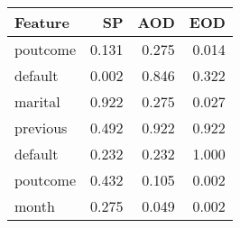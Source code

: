 \begin{tabular}{lrrr}
\toprule
Feature & SP & AOD & EOD \\
\midrule
poutcome & 0.131 & 0.275 & 0.014 \\
default & 0.002 & 0.846 & 0.322 \\
marital & 0.922 & 0.275 & 0.027 \\
previous & 0.492 & 0.922 & 0.922 \\
default & 0.232 & 0.232 & 1.000 \\
poutcome & 0.432 & 0.105 & 0.002 \\
month & 0.275 & 0.049 & 0.002 \\
\bottomrule
\end{tabular}
